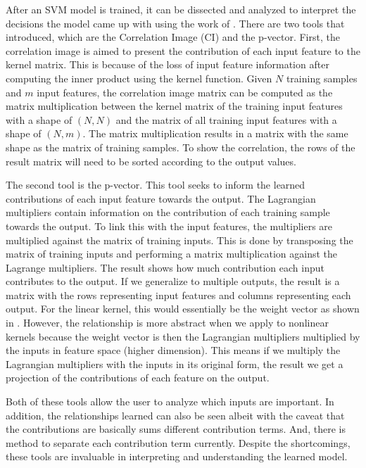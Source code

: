 After an SVM model is trained, it can be dissected and analyzed to interpret the decisions the model came up with using the work of \textcite{ustunVisualisationInterpretationSupport2007}. There are two tools that \autocite{ustunVisualisationInterpretationSupport2007} introduced, which are the Correlation Image (CI) and the p-vector. First, the correlation image is aimed to present the contribution of each input feature to the kernel matrix. This is because of the loss of input feature information after computing the inner product using the kernel function. Given \(N\) training samples and \(m\) input features, the correlation image matrix can be computed as the matrix multiplication between the kernel matrix of the training input features with a shape of \((N,N)\) and the matrix of all training input features with a shape of \((N,m)\). The matrix multiplication results in a matrix with the same shape as the matrix of training samples. To show the correlation, the rows of the result matrix will need to be sorted according to the output values.

The second tool is the p-vector. This tool seeks to inform the learned contributions of each input feature towards the output. The Lagrangian multipliers contain information on the contribution of each training sample towards the output. To link this with the input features, the multipliers are multiplied against the matrix of training inputs. This is done by transposing the matrix of training inputs and performing a matrix multiplication against the Lagrange multipliers. The result shows how much contribution each input contributes to the output. If we generalize to multiple outputs, the result is a matrix with the rows representing input features and columns representing each output. For the linear kernel, this would essentially be the weight vector as shown in . However, the relationship is more abstract when we apply to nonlinear kernels because the weight vector is then the Lagrangian multipliers multiplied by the inputs in feature space (higher dimension). This means if we multiply the Lagrangian multipliers with the inputs in its original form, the result we get a projection of the contributions of each feature on the output.

Both of these tools allow the user to analyze which inputs are important. In addition, the relationships learned can also be seen albeit with the caveat that the contributions are basically sums different contribution terms. And, there is method to separate each contribution term currently. Despite the shortcomings, these tools are invaluable in interpreting and understanding the learned model.

